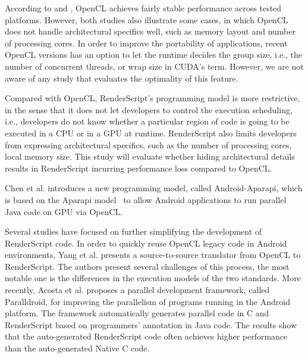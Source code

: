 According to \cite{komatsu2010evaluating} and \cite{dolbeau2013one}, OpenCL
achieves fairly stable performance across tested platforms. However, both
studies also illustrate some cases, in which OpenCL does not handle
architectural specifics well, such as memory layout and number of processing
cores. In order to improve the portability of applications, recent OpenCL
versions has an option to let the runtime decides the group size, i.e., the
number of concurrent threads, or wrap size in CUDA's term. However, we are not
aware of any study that evaluates the optimality of this feature.

Compared with OpenCL, RenderScript's programming model is more restrictive, in
the sense that it does not let developers to control the execution scheduling,
i.e., developers do not know whether a particular region of code is going to be
executed in a CPU or in a GPU at runtime. RenderScript also limits developers
from expressing architectural specifics, such as the number of processing cores,
local memory size. This study will evaluate whether hiding architectural details
results in RenderScript incurring performance loss compared to OpenCL.

Chen et al. \cite{6704508} introduces a new programming model, called
Android-Aparapi, which is based on the Aparapi model~\cite{Aparapi_web} to allow
Android applications to run parallel Java code on GPU via OpenCL.

Several studies have focused on further simplifying the development of
RenderScript code. In order to quickly reuse OpenCL legacy code in Android
environments, Yang et al.  \cite{yang2012o2render} presents a source-to-source
translator from OpenCL to RenderScript. The authors present several challenges
of this process, the most notable one is the differences in the execution models
of the two standards. More recently, Acosta et al.
\cite{alejandro2014performance} proposes a parallel development framework,
called Paralldroid, for improving the parallelism of programs running in the
Android platform. The framework automatically generates parallel code in C and
RenderScript based on programmers' annotation in Java code. The results show
that the auto-generated RenderScript code often achieves higher performance than
the auto-generated Native C code.

